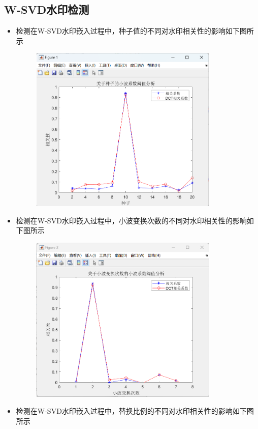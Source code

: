 \documentclass[a4paper,11pt,UTF8]{ctexart}
\newcommand{\bottomcaption}{%
\setlength{\abovecaptionskip}{6pt}%
\setlength{\belowcaptionskip}{6pt}%
\caption}
\newcommand{\xiaowuhao}{\fontsize{9pt}{\baselineskip}\selectfont}   %
\begin{document}
  \subsection{W-SVD水印检测}
    \begin{itemize}
      \item 检测在W-SVD水印嵌入过程中，种子值的不同对水印相关性的影响如下图所示
        \begin{figure}[H]
          \centering
          \includegraphics[width=9cm]{W-SVD_find_seed.png}
          \bottomcaption{\xiaowuhao{种子值-相关性关系}}
        \end{figure}
      \item 检测在W-SVD水印嵌入过程中，小波变换次数的不同对水印相关性的影响如下图所示
        \begin{figure}[H]
          \centering
          \includegraphics[width=9cm]{W-SVD_find_N.png}
          \bottomcaption{\xiaowuhao{小波变换次数-相关性关系}}
        \end{figure}
      \item 检测在W-SVD水印嵌入过程中，替换比例的不同对水印相关性的影响如下图所示

\end{itemize}
\end{document}
